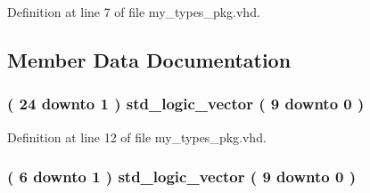 Definition at line 7 of file my\+\_\+types\+\_\+pkg.\+vhd.



\subsection{Member Data Documentation}
\hypertarget{classmy__types__pkg_aa080951555b10a6a6e7b072b6e604da0}{}
\subsubsection[{A\+R\+R\+A\+Y\+\_\+10\+\_\+24}]{ {\bfseries \textcolor{vhdlchar}{(}\textcolor{vhdlchar}{ }\textcolor{vhdlchar}{ } \textcolor{vhdldigit}{24} \textcolor{vhdlchar}{ }\textcolor{keywordflow}{downto}\textcolor{vhdlchar}{ }\textcolor{vhdlchar}{ } \textcolor{vhdldigit}{1} \textcolor{vhdlchar}{ }\textcolor{vhdlchar}{)}\textcolor{vhdlchar}{ }\textcolor{vhdlchar}{ }\textcolor{comment}{std\+\_\+logic\+\_\+vector}\textcolor{vhdlchar}{ }\textcolor{vhdlchar}{(}\textcolor{vhdlchar}{ }\textcolor{vhdlchar}{ } \textcolor{vhdldigit}{9} \textcolor{vhdlchar}{ }\textcolor{keywordflow}{downto}\textcolor{vhdlchar}{ }\textcolor{vhdlchar}{ } \textcolor{vhdldigit}{0} \textcolor{vhdlchar}{ }\textcolor{vhdlchar}{)}\textcolor{vhdlchar}{ }} \hspace{0.3cm}{\ttfamily [Type]}}\label{classmy__types__pkg_aa080951555b10a6a6e7b072b6e604da0}


Definition at line 12 of file my\+\_\+types\+\_\+pkg.\+vhd.

\hypertarget{classmy__types__pkg_a78ba7d7de881309ad4de369e71c0eb63}{}
\subsubsection[{A\+R\+R\+A\+Y\+\_\+10\+\_\+6}]{ {\bfseries \textcolor{vhdlchar}{(}\textcolor{vhdlchar}{ }\textcolor{vhdlchar}{ } \textcolor{vhdldigit}{6} \textcolor{vhdlchar}{ }\textcolor{keywordflow}{downto}\textcolor{vhdlchar}{ }\textcolor{vhdlchar}{ } \textcolor{vhdldigit}{1} \textcolor{vhdlchar}{ }\textcolor{vhdlchar}{)}\textcolor{vhdlchar}{ }\textcolor{vhdlchar}{ }\textcolor{comment}{std\+\_\+logic\+\_\+vector}\textcolor{vhdlchar}{ }\textcolor{vhdlchar}{(}\textcolor{vhdlchar}{ }\textcolor{vhdlchar}{ } \textcolor{vhdldigit}{9} \textcolor{vhdlchar}{ }\textcolor{keywordflow}{downto}\textcolor{vhdlchar}{ }\textcolor{vhdlchar}{ } \textcolor{vhdldigit}{0} \textcolor{vhdlchar}{ }\textcolor{vhdlchar}{)}\textcolor{vhdlchar}{ }} \hspace{0.3cm}{\ttfamily [Type]}}\label{classmy__types__pkg_a78ba7d7de881309ad4de369e71c0eb63}


